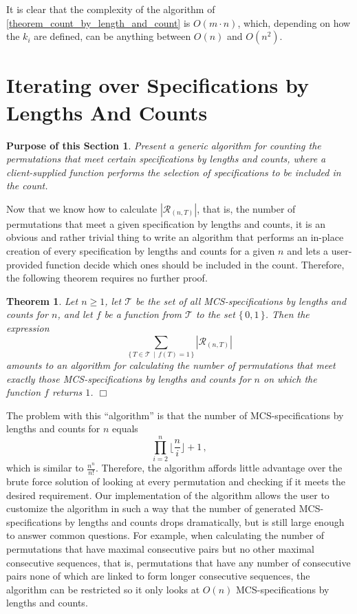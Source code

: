 \documentclass{article}
\newtheorem{theorem}{Theorem}[section]
\newtheorem{purpose}{Purpose of this Section}
\def\endproof{\mbox{$\Box$} \par }     %
\begin{document}
It is clear that the complexity of the algorithm of \ref{theorem_count_by_length_and_count}
is $O(m\cdot n)$, which, depending on how the $k_i$ are defined, can be anything between
$O(n)$ and $O(n^2)$.

\section{Iterating over Specifications by Lengths And Counts}

\begin{purpose}
  Present a generic algorithm for counting the permutations that meet certain specifications
  by lengths and counts, where a client-supplied function performs the selection of
  specifications to be included in the count.
\end{purpose}

Now that we know how to calculate $|{\mathcal R}_{(n,T)}|$, that is, the number of permutations that
meet a given specification by lengths and counts, it is an obvious and rather trivial thing to write
an algorithm that performs an in-place creation of every specification by lengths and counts for a
given $n$ and lets a user-provided function decide which ones should be included in the count.
Therefore, the following theorem requires no further proof.

\begin{theorem}\label{theorem_iterating_over_specs_by_count_by_length_and_count}
  Let $n \geq 1$, let ${\mathcal T}$ be the set of all MCS-specifications by
  lengths and counts for $n$, and let $f$ be a function from ${\mathcal T}$ to the set $\{\, 0, 1\,\}$.
  Then the expression
  $$
  \sum_{\{\,T \in{\mathcal T}\,\mid\, f(T) = 1\,\}}|{\mathcal R}_{(n,T)}|
  $$
  amounts to an algorithm for calculating the number of permutations that meet exactly
  those MCS-specifications by lengths and counts for $n$ on which the function $f$ returns $1$.
  \endproof
\end{theorem}

The problem with this ``algorithm'' is that the number of MCS-specifications by lengths and counts
for $n$ equals
$$
\prod_{i=2}^{n}\lfloor\frac{n}{i}\rfloor + 1\,,
$$
which is similar to $\frac{n^n}{n!}$. Therefore, the algorithm affords little advantage over
the brute force solution of looking at every permutation and checking if it meets the desired
requirement. Our implementation of the algorithm \cite{Algos} allows the user to customize the
algorithm in such a way that the number of generated MCS-specifications by lengths and counts
drops dramatically, but is still large enough to answer common questions. For example, when
calculating the number of permutations that have maximal consecutive pairs but no other maximal
consecutive sequences, that is, permutations that have any number of consecutive pairs none of
which are linked to form longer consecutive sequences, the algorithm can be restricted so it
only looks at $O(n)$ MCS-specifications by lengths and counts.
\end{document}
